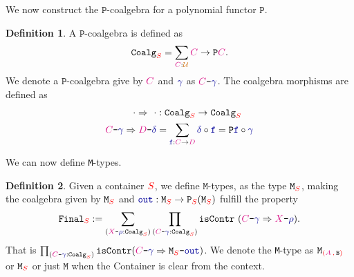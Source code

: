 \documentclass[twoside,11pt,openright]{report}
\theoremstyle{plain} %
\theoremstyle{definition}
\newtheorem{defn}{Definition}[section]
\theoremstyle{remark}
\newcommand*{\type}[1]{\textcolor{magenta!90!black}{#1}}
\newcommand*{\container}[1]{\textcolor{red}{#1}}
\newcommand*{\containerpair}[2]{\textcolor{red}{(}#1\,\textcolor{red}{,}\,#2\textcolor{red}{)}}
\newcommand*{\universe}[1]{\textcolor{orange!80!black}{#1}}
\newcommand*{\coalg}[2]{#1\texttt{-}#2}
\newcommand*{\function}[1]{\textcolor{blue!60!black}{\ensuremath{\mathtt{#1}}}}
\newcommand*{\typeformer}[1]{\ensuremath{\mathtt{#1}}}
\newcommand*{\functor}[1]{\ensuremath{\mathbf{\mathtt{#1}}}}
\begin{document}
\noindent We now construct the \(\functor{P}\)-coalgebra for a polynomial functor \(\functor{P}\).
\begin{defn}
  A \(\functor{P}\)-coalgebra is defined as
  \begin{equation}
    \typeformer{Coalg}_{\container{S}} = \sum_{\type{C} : \universe{\mathcal{U}}} \type{C} \rightarrow \functor{P}\type{C}.
  \end{equation}
  We denote a \(\functor{P}\)-coalgebra give by \(\type{C}\) and \(\function{\gamma}\) as \(\coalg{\type{C}}{\function{\gamma}}\). The coalgebra morphisms are defined as
  \begin{equation}
    \begin{aligned}
      \cdot \Rightarrow ~\cdot &: \typeformer{Coalg}_{\container{S}} \rightarrow \typeformer{Coalg}_{\container{S}} \\
      \coalg{\type{C}}{\function{\gamma}} \Rightarrow \coalg{\type{D}}{\function{\delta}} &= \sum_{\function{f} : \type{C} \rightarrow \type{D}} \function{\delta} \circ \function{f} = \functor{P} \function{f} \circ \function{\gamma}
    \end{aligned}
  \end{equation}
\end{defn}
\noindent We can now define \texttt{M}-types.
\begin{defn}
  Given a container \(\container{S}\), we define \(\mathtt{M}\)-types, as the type \(\typeformer{M}_{\container{S}}\), making the coalgebra given by \(\typeformer{M}_{\container{S}}\) and \(\function{out} : \typeformer{M}_{\container{S}} \rightarrow \functor{P}_{\container{S}}(\typeformer{M}_{\container{S}})\) fulfill the property
  \begin{equation}
    \typeformer{Final}_{\container{S}} := \sum_{(\coalg{\type{X}}{\function{\rho}} : \mathtt{Coalg}_{\container{S}})} \prod_{(\coalg{\type{C}}{\function{\gamma}} : \mathtt{Coalg}_{\container{S}})} \mathtt{isContr}~(\coalg{\type{C}}{\function{\gamma}} \Rightarrow \coalg{\type{X}}{\function{\rho}}).
  \end{equation}
  That is \(\prod_{(\coalg{\type{C}}{\function{\gamma}} : \mathtt{Coalg}_{\container{S}})} \mathtt{isContr}(\coalg{\type{C}}{\function{\gamma}} \Rightarrow \coalg{\typeformer{M}_{\container{S}}}{\function{out}})\). We denote the \texttt{M}-type as \(\typeformer{M}_{\containerpair{\type{A}}{\typeformer{B}}}\) or \(\typeformer{M}_{\container{S}}\) or just \(\typeformer{M}\) when the Container is clear from the context.
\end{defn}
\end{document}
